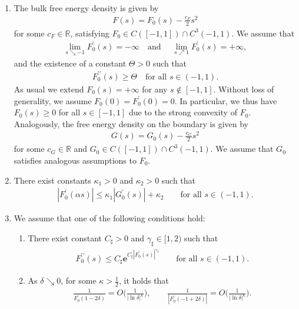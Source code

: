 \documentclass[10pt,reqno]{amsart}
\theoremstyle{remark}
\numberwithin{equation}{section}
\newcommand{\abs}[1]{| #1 |}
\newcommand{\R}{\mathbb R}
\newcommand{\e}{\mathbf{e}}
\begin{document}
\begin{enumerate}[label=\textnormal{\bfseries(A\arabic*)}]
    \item \label{Assumption:Potential} The bulk free energy density is given by
    \begin{align*}
    	F(s) = F_0(s) - \frac{c_F}{2}s^2
    \end{align*}
    for some $c_F\in\R$, satisfying $F_0 \in C([-1,1])\cap C^3(-1,1)$. We assume that
    \begin{align*}
    	\lim_{s\searrow -1} F_0^\prime(s) = - \infty \quad\text{and~}\quad \lim_{s\nearrow 1} F_0^\prime(s) = + \infty,
    \end{align*}
    and the existence of a constant $\Theta > 0$ such that
    \begin{align}\label{Pot:F_0:Convex}
    	F_0^{\prime\prime}(s) \geq \Theta
        \quad\text{for all $s\in(-1,1)$.}
    \end{align}
    As usual we extend $F_0(s) = +\infty$ for any $s\not\in[-1,1]$. Without loss of generality, we assume $F_0(0) = F_0^\prime(0) = 0$. In particular, we thus have $F_0(s) \geq 0$ for all $s\in[-1,1]$ due to the strong convexity of $F_0$. 
    Analogously, the free energy density on the boundary is given by
    \begin{align*}
    	G(s) = G_0(s) - \frac{c_G}{2}s^2
    \end{align*}
    for some $c_G\in\R$ and $G_0\in C([-1,1])\cap C^3(-1,1)$. We assume that $G_0$ satisfies analogous assumptions to $F_0$.
    \item \label{Assumption:DominationProperty} There exist constants $\kappa_1 > 0$ and $\kappa_2 > 0$ such that
    \begin{align*}
    	\abs{F_0^\prime(\alpha s)} \leq \kappa_1\abs{G_0^\prime(s)} + \kappa_2 \qquad\text{for all~}s\in(-1,1).
    \end{align*}
    \item \label{Assumption:Potential:Growth} We assume that one of the following conditions hold:
    \begin{enumerate}[label=\textnormal{\bfseries(A.7.\arabic*)}]
        \item There exist constant $C_\sharp > 0$ and $\gamma_\sharp\in[1,2)$ such that
        \begin{align*}
            F_0^{\prime\prime}(s) \leq C_\sharp \e^{C_\sharp\abs{F_0^\prime(s)}^{\gamma_\sharp}} \qquad\text{for all~}s\in(-1,1).
        \end{align*}
        \item As $\delta\searrow 0$, for some $\kappa > \frac12$, it holds that
        \begin{align*}
            \frac{1}{F_0^\prime(1-2\delta)} = O\bigg(\frac{1}{\abs{\ln \delta}^\kappa}\bigg), \qquad \frac{1}{\abs{F_0^\prime(-1+2\delta)}} = O\bigg(\frac{1}{\abs{\ln\delta}^\kappa}\bigg).
        \end{align*}
    \end{enumerate}
\end{enumerate}
\end{document}
